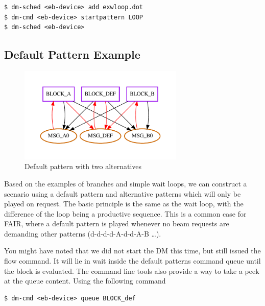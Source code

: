\begin{lstlisting}[style = customshell]
$ dm-sched <eb-device> add exwloop.dot
$ dm-cmd <eb-device> startpattern LOOP
$ dm-sched <eb-device>
\end{lstlisting}

\newpage
\subsection{Default Pattern Example}

\begin{figure}[H]
   \centering
   \def\svgwidth{0.7\textwidth}
   \includegraphics*[width=0.7\textwidth,keepaspectratio]{Figures/exdefpat}
   \caption{ Default pattern with two alternatives }
   \label{fig:exdefpat}
\end{figure}



Based on the examples of branches and simple wait loops, we can construct a scenario using a default pattern and alternative patterns which will only be played on request.
The basic principle is the same as the wait loop, with the difference of the loop being a productive sequence. This is a common case for FAIR, where a default pattern is played whenever no
beam requests are demanding other patterns (d-d-d-d-A-d-d-A-B \dots).
\par You might have noted that we did not start the DM this time, but still issued the flow command. It will lie in wait inside the default patterns command queue until the block is evaluated.
The command line tools also provide a way to take a peek at the queue content. Using the following command

\begin{lstlisting}[style = customshell]
$ dm-cmd <eb-device> queue BLOCK_def
\end{lstlisting}

